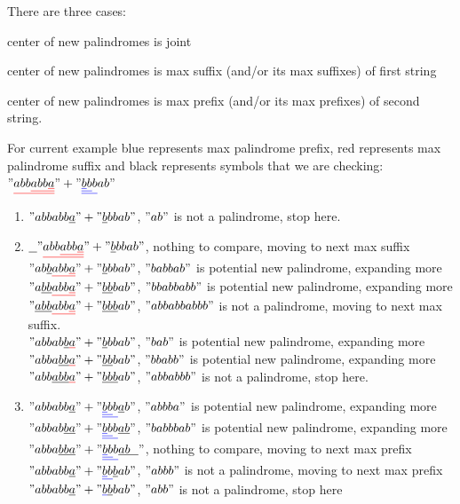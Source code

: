 There are three cases: \begin{enumerate*}
  \item center of new palindromes is joint
  \item center of new palindromes is max suffix (and/or its max suffixes) of first string
  \item center of new palindromes is max prefix (and/or its max prefixes) of second string.
\end{enumerate*}
For current example blue represents max palindrome prefix, red represents max palindrome suffix and black represents symbols that we are checking:
$"\mathunderline{red}{abb\mathunderline{red}{abb\mathunderline{red}{a}}}" + "\mathunderline{blue}{\mathunderline{blue}{\mathunderline{blue}{b}b}b}ab"$
\begin{enumerate}
\item $"abbabb\underline{a}" + "\underline{b}bbab"$, $"ab"$ is not a palindrome, stop here.
\item $\underline{\ \ }"\mathunderline{red}{abb\mathunderline{red}{abb\mathunderline{red}{a}}}" + "\underline{b}bbab"$, nothing to compare, moving to next max suffix \\
$"ab\underline{b}\mathunderline{red}{abb\mathunderline{red}{a}}" + "\underline{b}bbab"$, $"babbab"$ is potential new palindrome, expanding more\\
$"a\underline{bb}\mathunderline{red}{abb\mathunderline{red}{a}}" + "\underline{bb}bab"$, $"bbabbabb"$ is potential new palindrome, expanding more\\
$"\underline{abb}\mathunderline{red}{abb\mathunderline{red}{a}}" + "\underline{bbb}ab"$, $"abbabbabbb"$ is not a palindrome, moving to next max suffix.\\
$"abbab\underline{b}\mathunderline{red}{a}" + "\underline{b}bbab"$, $"bab"$ is potential new palindrome, expanding more\\
$"abba\underline{bb}\mathunderline{red}{a}" + "\underline{bb}bab"$, $"bbabb"$ is potential new palindrome, expanding more\\
$"abb\underline{abb}\mathunderline{red}{a}" + "\underline{bbb}ab"$, $"abbabbb"$ is not a palindrome, stop here.
\item 
$"abbabb\underline{a}" + "\mathunderline{blue}{\mathunderline{blue}{\mathunderline{blue}{b}b}b}\underline{a}b"$, $"abbba"$ is potential new palindrome, expanding more\\
$"abbab\underline{ba}" + "\mathunderline{blue}{\mathunderline{blue}{\mathunderline{blue}{b}b}b}\underline{ab}"$, $"babbbab"$ is potential new palindrome, expanding more\\
$"abba\underline{bba}" + "\mathunderline{blue}{\mathunderline{blue}{\mathunderline{blue}{b}b}b}\underline{ab\ \ }"$, nothing to compare, moving to next max prefix \\
$"abbabb\underline{a}" + "\mathunderline{blue}{\mathunderline{blue}{b}b}\underline{b}ab"$, $"abbb"$ is not a palindrome, moving to next max prefix\\
$"abbabb\underline{a}" + "\mathunderline{blue}{b}\underline{b}bab"$, $"abb"$ is not a palindrome, stop here\\
\end{enumerate}
